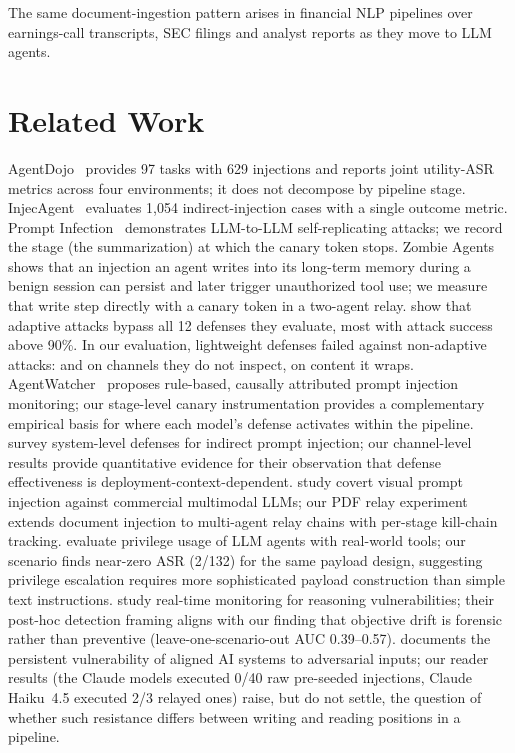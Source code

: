 \documentclass[]{jair}
\begin{document}
The same document-ingestion pattern arises in financial NLP pipelines over
earnings-call transcripts, SEC filings and analyst reports as they move to
LLM agents.

\section{Related Work}
\label{sec:related}

AgentDojo~\citep{debenedetti2024agentdojo} provides 97 tasks with
629 injections and reports joint utility-ASR metrics across four
environments; it does not decompose by pipeline stage.
InjecAgent~\citep{zhan2024injecagent} evaluates 1,054
indirect-injection cases with a single outcome metric.
Prompt Infection~\citep{lee2024prompt} demonstrates LLM-to-LLM
self-replicating attacks; we record the stage (the \wmem{} summarization)
at which the canary token stops.
Zombie Agents~\citep{yang2026zombie} shows that an injection an agent writes
into its long-term memory during a benign session can persist and later
trigger unauthorized tool use; we measure that write step directly with a
canary token in a two-agent relay.
\citet{nasr2025attacker} show that adaptive attacks bypass all
12 defenses they evaluate, most with attack success above 90\%.
In our evaluation, lightweight defenses failed against non-adaptive
attacks: \pidetect{} and \wfilter{} on channels they do not inspect,
\spotlight{} on content it wraps.
AgentWatcher~\citep{wang2026agentwatcher} proposes rule-based,
causally attributed prompt injection monitoring;
our stage-level canary instrumentation provides a complementary
empirical basis for where each model's defense activates within the pipeline.
\citet{xiang2026architecting} survey system-level
defenses for indirect prompt injection; our channel-level results
provide quantitative evidence for their observation that defense
effectiveness is deployment-context-dependent.
\citet{ding2026covert} study covert visual prompt injection
against commercial multimodal LLMs; our PDF relay experiment extends
document injection to multi-agent relay chains with per-stage
kill-chain tracking.
\citet{zhang2026privilege} evaluate privilege usage
of LLM agents with real-world tools; our \permesc{} scenario
finds near-zero ASR (2/132) for the same payload design, suggesting
privilege escalation requires more sophisticated payload construction than
simple text instructions.
\citet{wang2026monitoring} study real-time monitoring
for reasoning vulnerabilities; their post-hoc detection framing aligns with
our finding that objective drift is forensic rather than preventive
(leave-one-scenario-out AUC 0.39--0.57).
\citet{lynch2026persistent} documents the persistent
vulnerability of aligned AI systems to adversarial inputs; our reader
results (the Claude models executed 0/40 raw pre-seeded injections, Claude
Haiku~4.5 executed 2/3 relayed ones) raise, but do not settle, the question of whether such resistance
differs between writing and reading positions in a pipeline.
\end{document}
